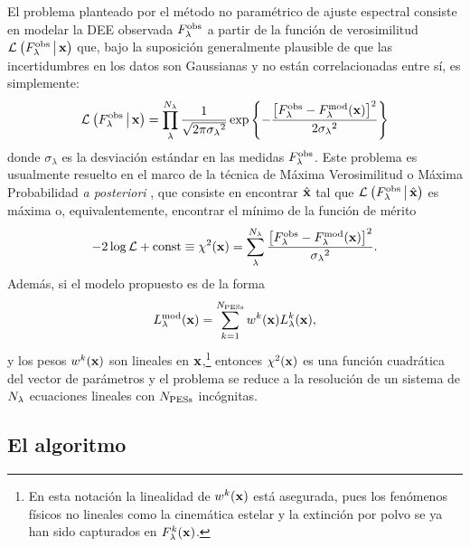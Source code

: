 El problema planteado por el método no paramétrico de ajuste espectral consiste en modelar la DEE
observada $\sedt[F]{obs}$ a partir de la función de verosimilitud $\lik{\sedt[F]{obs}}{\hip}$ que,
bajo la suposición generalmente plausible de que las incertidumbres en los datos son Gaussianas y no
están correlacionadas entre sí, es simplemente:
%
\begin{equation}\label{ec:likelihood}
\lik{\sedt[F]{obs}}{\hip} = \prod_{\lambda}^{\Ni{\lambda}}\frac{1}{\sqrt{2\pi{\sigma_\lambda}^2}}
\exp{\left\{-\frac{\left[\sedt[F]{obs}-\sedt[F]{mod}(\hip)\right]^2}{2{\sigma_\lambda}^2}\right\}}
\end{equation}
%
donde $\sigma_\lambda$ es la desviación estándar en las medidas $\sedt[F]{obs}$. Este problema es
usualmente resuelto en el marco de la técnica de Máxima Verosimilitud o Máxima Probabilidad \emph{a
posteriori} \citep[\eg,][]{Heavens2000, CidFernandes2005}, que consiste en encontrar $\hhi$ tal que
$\lik{\sedt[F]{obs}}{\hhi}$ es máxima o, equivalentemente, encontrar el mínimo de la función de
mérito
%
\begin{equation}\label{ec:chi-square}
-2\log{\mathcal{L}}+\text{const}\equiv\chi^2(\hip) = \sum_\lambda^{\Ni{\lambda}}
\frac{\left[\sedt[F]{obs}-\sedt[F]{mod}(\hip)\right]^2}{{\sigma_\lambda}^2}.
\end{equation}
%
Además, si el modelo propuesto es de la forma
%
\begin{equation}\label{ec:non-model}
\sedt{mod}(\hip) = \sum_{k=1}^{\Nt{PESs}}w^k(\hip)\sedi{k}(\hip),
\end{equation}
%
y los pesos $w^k(\hip)$ son lineales en $\hip$,\footnote{En esta notación la linealidad de
$w^k({\hip})$ está asegurada, pues los fenómenos físicos no lineales como la cinemática estelar y la
extinción por polvo se ya han sido capturados en $\sedi[F]{k}(\hip)$.} entonces $\chi^2(\hip)$ es
una función cuadrática del vector de parámetros y el problema se reduce a la resolución de un
sistema de $\Ni{\lambda}$ ecuaciones lineales con $\Nt{PESs}$ incógnitas.

\subsection{El algoritmo \dynbas}

